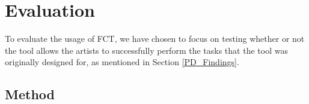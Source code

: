 \section{Evaluation}



To evaluate the usage of FCT, we have chosen to focus on testing whether or not the tool allows the artists to successfully perform the tasks that the tool was originally designed for, as mentioned in Section \ref{PD_Findings}.



\subsection{Method} \label{method}





%
%
%